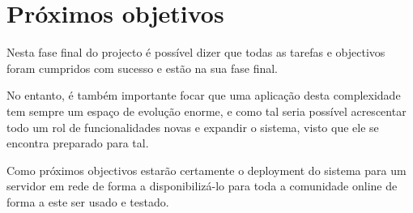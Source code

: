 \section{Próximos objetivos}
Nesta fase final do projecto é possível dizer que todas as tarefas e objectivos 
foram cumpridos com sucesso e estão na sua fase final.

No entanto, é também importante focar que uma aplicação desta complexidade tem sempre um espaço de evolução enorme, e como tal seria possível acrescentar todo um rol de funcionalidades novas e expandir o sistema, visto que ele se encontra preparado para tal.

Como próximos objectivos estarão certamente o deployment do sistema para um 
servidor em rede de forma a disponibilizá-lo para toda a comunidade online de 
forma a este ser usado e testado.


\newpage